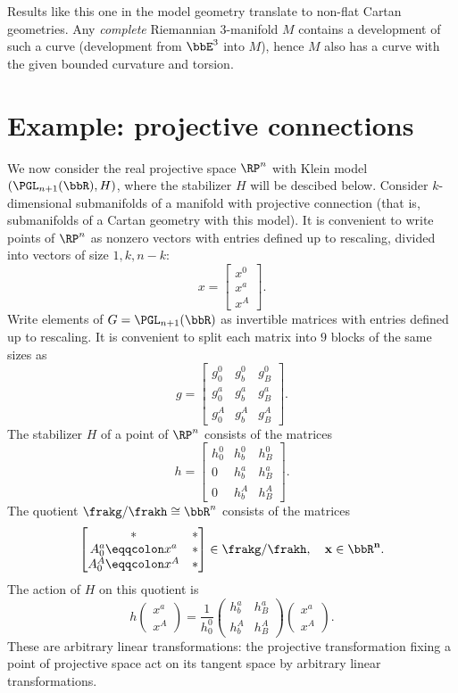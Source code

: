 Results like this one in the model geometry translate to non-flat Cartan geometries. Any \emph{complete} Riemannian $3$-manifold $M$ contains a development of such a curve (development from $\bbE^3$ into $M$), hence $M$ also has a curve with the given bounded curvature and torsion.




\section{Example: projective connections}

We now consider the real projective space $\RP^n$ with Klein model $(\PGL_{n+1}(\bbR),H)$, where the stabilizer $H$ will be descibed below. Consider $k$-dimensional submanifolds of a manifold with projective connection (that is, submanifolds of a Cartan geometry with this model). It is convenient to write points of $\RP^n$ as nonzero vectors with entries defined up to rescaling, divided into vectors of size $1,k,n-k$:
\[x=\begin{bmatrix}
    x^0\\
    x^a\\
    x^A
\end{bmatrix}.\]
Write elements of $G=\PGL_{n+1}(\bbR)$ as invertible matrices with entries defined up to rescaling. It is convenient to split each matrix into $9$ blocks of the same sizes as 
\[g=\begin{bmatrix}
    g_0^0 & g^0_b & g^0_B\\
    g^a_0 & g^a_b & g^a_B\\
    g^A_0 & g^A_b & g^A_B
\end{bmatrix}.\]
The stabilizer $H$ of a point of $\RP^n$ consists of the matrices 
\[h=\begin{bmatrix}
    h^0_0 & h^0_b & h^0_B\\
    0 & h^a_b & h^a_B\\
    0 & h^A_b & h^A_B
\end{bmatrix}.\]
The quotient $\frakg\slash\frakh\cong \bbR^n$ consists of the matrices 
\[\begin{bmatrix}
     * & *\\
     A^a_0\eqqcolon x^a & \ast\\
     A^A_0\eqqcolon x^A & \ast
\end{bmatrix} \in \frakg\slash\frakh,\quad \bf{x}\in \bbR^n.\]
The action of $H$ on this quotient is 
\[h \begin{pmatrix}
    x^a\\x^A
\end{pmatrix}=\frac{1}{h^0_0}\begin{pmatrix}
    h^a_b & h^a_B\\ h^A_b & h^A_B
\end{pmatrix}\begin{pmatrix}
    x^a \\ x^A
\end{pmatrix}.\]
These are arbitrary linear transformations: the projective transformation fixing a point of projective space act on its tangent space by arbitrary linear transformations. 

